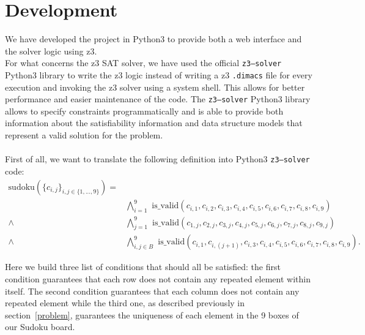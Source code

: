 \documentclass[]{usiinfprospectus}
\newcounter{row}
\newcounter{col}
\begin{document}
\section{Development}\label{development}
We have developed the project in Python3 to provide both a web interface and the solver logic using z3.\\
For what concerns the z3 SAT solver, we have used the official \texttt{z3–solver} Python3 library to write the z3 logic instead of writing a z3 \texttt{.dimacs} file for every execution and invoking the z3 solver using a system shell. This allows for better performance and easier maintenance of the code.
The \texttt{z3–solver} Python3 library allows to specify constraints programmatically and is able to provide both information about the satisfiability information and data structure models that represent a valid solution for the problem.\\ \\
First of all, we want to translate the following definition into Python3 \texttt{z3–solver} code:
\begin{align*}
\text{sudoku}\left( \{ c_{i,j} \}_{i, j \in \{ 1,...,9\}} \right) = & \nonumber\\
       & \bigwedge^9_{i=1} \text{ is\_valid}\left(  c_{i,1},  c_{i,2},  c_{i,3},  c_{i,4},  c_{i,5},  c_{i,6},  c_{i,7},  c_{i,8},  c_{i,9}  \right)\\
\wedge &\bigwedge^9_{j=1} \text{ is\_valid}\left( c_{1,j},  c_{2,j},  c_{3,j},  c_{4,j},  c_{5,j},  c_{6,j},  c_{7,j},  c_{8,j},  c_{9,j} \right) \\
\wedge &\bigwedge^9_{i,j \in B} \text{ is\_valid}\left( c_{i,1},  c_{i,(j+1)},  c_{i,3},  c_{i,4},  c_{i,5},  c_{i,6},  c_{i,7},  c_{i,8},  c_{i,9} \right).
\end{align*}

\noindent
Here we build three list of conditions that should all be satisfied: the first condition guarantees that each row does not contain any repeated element within itself. The second condition guarantees that each column does not contain any repeated element while the third one, as described previously
in section~\ref{problem}, guarantees the uniqueness of each element in the 9 boxes of our Sudoku board.
\end{document}

